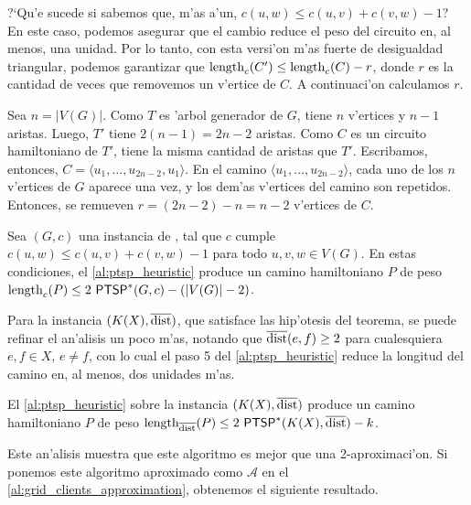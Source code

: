 ?`Qu'e sucede si sabemos que, m'as a'un, $c(u, w) \leq c(u, v) + c(v, w) - 1$? En este caso, podemos asegurar que el cambio reduce el peso del circuito en, al menos, una unidad. Por lo tanto, con esta versi'on m'as fuerte de desigualdad triangular, podemos garantizar que $\textnormal{length}_c(C') \leq \textnormal{length}_c(C) - r$, donde $r$ es la cantidad de veces que removemos un v'ertice de $C$. A continuaci'on calculamos $r$.

Sea $n = |V(G)|$. Como $T$ es 'arbol generador de $G$, tiene $n$ v'ertices y $n - 1$ aristas. Luego, $T'$ tiene $2(n - 1) = 2n - 2$ aristas. Como $C$ es un circuito hamiltoniano de $T'$, tiene la misma cantidad de aristas que $T'$. Escribamos, entonces, $C = \langle u_1, \dots, u_{2n - 2}, u_1 \rangle$. En el camino $\langle u_1, \dots, u_{2n - 2} \rangle$, cada uno de los $n$ v'ertices de $G$ aparece una vez, y los dem'as v'ertices del camino son repetidos. Entonces, se remueven $r = (2n - 2) - n = n - 2$ v'ertices de $C$.

\begin{theorem}
Sea $(G, c)$ una instancia de , tal que $c$ cumple $c(u, w) \leq c(u, v) + c(v, w) - 1$ para todo $u, v, w \in V(G)$. En estas condiciones, el \autoref{al:ptsp_heuristic} produce un camino hamiltoniano $P$ de peso $\textnormal{length}_c(P) \leq 2 \text{ } \textnormal{\textsf{PTSP}}^*(G, c) - (|V(G)| - 2)$.
\end{theorem}

Para la instancia $(K(X), \overline{\textnormal{dist}})$, que satisface las hip'otesis del teorema, se puede refinar el an'alisis un poco m'as, notando que $\overline{\textnormal{dist}}(e, f) \geq 2$ para cualesquiera $e, f \in X$, $e \neq f$, con lo cual el paso 5 del \autoref{al:ptsp_heuristic} reduce la longitud del camino en, al menos, dos unidades m'as.

\begin{theorem}
El \autoref{al:ptsp_heuristic} sobre la instancia $(K(X), \overline{\textnormal{dist}})$ produce un camino hamiltoniano $P$ de peso $\textnormal{length}_{\overline{\textnormal{dist}}}(P) \leq 2 \text{ } \textnormal{\textsf{PTSP}}^*(K(X), \overline{\textnormal{dist}}) - k$.
\end{theorem}

Este an'alisis muestra que este algoritmo es mejor que una 2-aproximaci'on. Si ponemos este algoritmo aproximado como $\mathcal{A}$ en el \autoref{al:grid_clients_approximation}, obtenemos el siguiente resultado.

